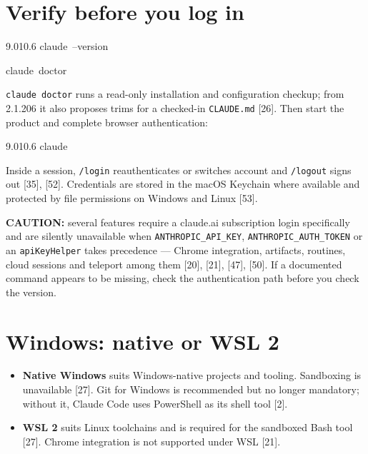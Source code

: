 \documentclass[11pt,a4paper,twoside,openany]{book}
\newcommand{\cl}[1]{\noindent\mbox{#1}\par}
\begin{document}
\FloatBarrier
\setcounter{section}{2}
\section{Verify before you log in}

\begin{codeblock}{9.0}{10.6}
\cl{claude~--version}
\cl{claude~doctor}
\end{codeblock}

\texttt{claude doct\allowbreak{}or} runs a read-only installation and configuration checkup; from 2.1.206 it also proposes trims for a checked-in \texttt{CLAUDE.\allowbreak{}md} [26]. Then start the product and complete browser authentication:


\begin{codeblock}{9.0}{10.6}
\cl{claude}
\end{codeblock}

Inside a session, \texttt{/\allowbreak{}login} reauthenticates or switches account and \texttt{/\allowbreak{}logout} signs out [35], [52]. Credentials are stored in the macOS Keychain where available and protected by file permissions on Windows and Linux [53].


\textbf{CAUTION:} several features require a claude.ai subscription login specifically and are silently unavailable when \texttt{ANTHROPIC\_\allowbreak{}API\_\allowbreak{}KEY}, \texttt{ANTHROPIC\_\allowbreak{}AUTH\_\allowbreak{}TOKEN} or an \texttt{api\allowbreak{}Key\allowbreak{}Helper} takes precedence — Chrome integration, artifacts, routines, cloud sessions and teleport among them [20], [21], [47], [50]. If a documented command appears to be missing, check the authentication path before you check the version.


\FloatBarrier
\setcounter{section}{3}
\section{Windows: native or WSL 2}

\begin{itemize}
\item \textbf{Native Windows} suits Windows-native projects and tooling. Sandboxing is unavailable [27]. Git for Windows is recommended but no longer mandatory; without it, Claude Code uses PowerShell as its shell tool [2].
\item \textbf{WSL 2} suits Linux toolchains and is required for the sandboxed Bash tool [27]. Chrome integration is not supported under WSL [21].
\end{itemize}
\end{document}
